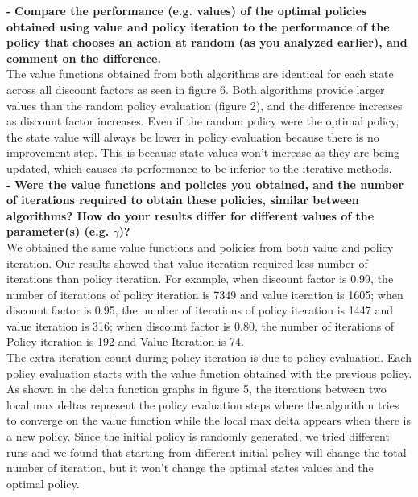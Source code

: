 \documentclass[11pt]{article}
\begin{document}
\noindent
\textbf{-}
\noindent
\textbf{Compare the performance (e.g. values) of the optimal policies obtained
using value and policy iteration to the performance of the policy that chooses
an action at random (as you analyzed earlier), and comment on the difference.}
\\

\noindent
The value functions obtained from both algorithms are identical for each state
across all discount factors as seen in figure 6. Both algorithms provide larger
values than the random policy evaluation (figure 2), and the difference
increases as discount factor increases. Even if the random policy were the
optimal policy, the state value will always be lower in policy evaluation
because there is no improvement step. This is because state values won’t
increase as they are being updated, which causes its performance to be inferior
to the iterative methods. \\

\noindent
\textbf{-}
\noindent
\textbf{Were the value functions and policies you obtained, and the number of
iterations required to obtain these policies, similar between algorithms? How do
your results differ for different values of the parameter(s) (e.g. $\gamma$)?}
\\

\noindent
We obtained the same value functions and policies from both value and policy
iteration. Our results showed that value iteration required less number of
iterations than policy iteration. For example, when discount factor is 0.99, the
number of iterations of policy iteration is 7349 and value iteration is 1605;
when discount factor is 0.95, the number of iterations of policy iteration is
1447 and value iteration is 316; when discount factor is 0.80, the number of
iterations of Policy iteration is 192 and Value Iteration is 74.\\

\noindent
The extra iteration count during policy iteration is due to policy evaluation.
Each policy evaluation starts with the value function obtained with the previous
policy. As shown in the delta function graphs in figure 5, the iterations
between two local max deltas represent the policy evaluation steps where the
algorithm tries to converge on the value function while the local max delta
appears when there is a new policy. Since the initial policy is randomly
generated, we tried different runs and we found that starting from different
initial policy will change the total number of iteration, but it won’t change
the optimal states values and the optimal policy. \\
\end{document}
